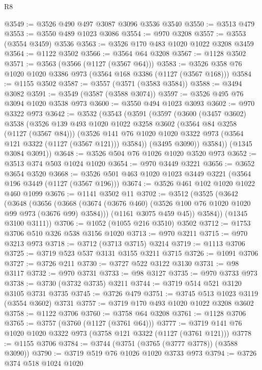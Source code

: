 \begin{lexlean}{R8}
\begin{coremodule}
@3549 := @3526 @490 @497 @3087 @3096 @3536 @3540
@3550 := @3513 @479
@3553 := @3550 @489 @1023 @3086
@3554 := @970 @3208
@3557 := @3553 (@3554 @3459) @3536
@3563 := @3526 @170 @483 @1020 @1022 @3208 @3459
@3564 := @1122 @3502
@3566 := @3564 @64 @3208
@3567 := @1128 @3502
@3571 := @3563 (@3566 (@1127 (@3567 @64)))
@3583 := @3526 @358 @76 @1020 @1020 @3386 @973 (@3564 @168 @3386 (@1127 (@3567 @168)))
@3584 := @1155 @3502
@3587 := @3557 (@3571 (@3583 @3584))
@3588 := @3494 @3082
@3591 := @3549 (@3587 (@3588 @3074))
@3597 := @3526 @495 @76 @3094 @1020 @3538 @973
@3600 := @3550 @494 @1023 @3093
@3602 := @970 @3322 @973
@3642 := @3532
    (@3543
      (@3591
        (@3597
          (@3600
            (@3457 @3602)
            @3538
            (@3526
              @139
              @493
              @1020
              @1022
              @3258
              @3602
              (@3564 @84 @3258 (@1127 (@3567 @84)))
              (@3526 @141 @76 @1020 @1020 @3322 @973 (@3564 @121 @3322 (@1127 (@3567 @121))) @3584))
            (@3495 @3090))
          @3584))
      (@1345 @3084 @3091))
@3648 := @3526 @504 @76 @1026 @1020 @3520 @973
@3652 := @3513 @374 @503 @1024 @1020
@3654 := @970 @3449 @3221
@3656 := @3652 @3654 @3520
@3668 := @3526 @501 @463 @1020 @1023 @3449 @3221 (@3564 @196 @3449 (@1127 (@3567 @196)))
@3674 := @3526 @461 @102 @1020 @1022 @460 @1099
@3676 := @1141 @3502 @11
@3702 := @3512
    (@3525
      (@3642
        (@3648
          (@3656
            (@3668 (@3674 (@3676 @460) (@3526 @100 @76 @1020 @1020 @99 @973 (@3676 @99) @3584)))
            (@1161 @3075 @459 @45))
          @3584))
      (@1345 @3100 @3111))
@3706 := @1052 (@1055 @216 @3510) @3502
@3712 := @1753 @3706 @510 @326 @538 @3156 @1020
@3713 := @970 @3211
@3715 := @970 @3213 @973
@3718 := @3712 (@3713 @3715) @3214
@3719 := @1113 @3706
@3725 := @3719 @523 @537 @3131 @3155 @3211 @3715
@3726 := @1091 @3706
@3727 := @3726 @211
@3730 := @3727 @522 @3122 @3130
@3731 := @98 @3117
@3732 := @970 @3731
@3733 := @98 @3127
@3735 := @970 @3733 @973
@3738 := @3730 (@3732 @3735) @3211
@3744 := @3719 @514 @521 @3120 @3105 @3731 @3735
@3745 := @3726 @479
@3751 := @3745 @513 @1023 @3119 (@3554 @3602) @3731
@3757 := @3719 @170 @493 @1020 @1022 @3208 @3602
@3758 := @1122 @3706
@3760 := @3758 @64 @3208
@3761 := @1128 @3706
@3765 := @3757 (@3760 (@1127 (@3761 @64)))
@3777 := @3719 @141 @76 @1020 @1020 @3322 @973 (@3758 @121 @3322 (@1127 (@3761 @121)))
@3778 := @1155 @3706
@3784 := @3744 (@3751 (@3765 (@3777 @3778)) (@3588 @3090))
@3790 := @3719 @519 @76 @1026 @1020 @3733 @973
@3794 := @3726 @374 @518 @1024 @1020

\end{coremodule}
\end{lexlean}
